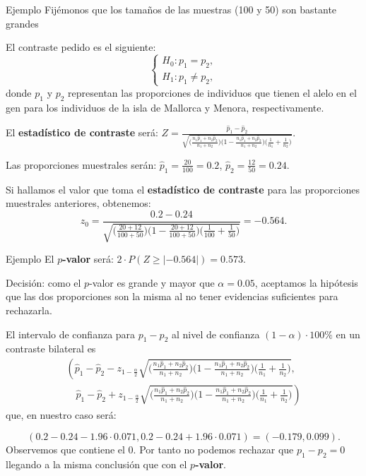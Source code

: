 \documentclass[
  ignorenonframetext,
]{beamer}
\begin{document}
\begin{frame}{Ejemplo}
\protect\hypertarget{ejemplo-42}{}
Fijémonos que los tamaños de las muestras (100 y 50) son bastante
grandes

El contraste pedido es el siguiente: \[
\left\{\begin{array}{l}
H_0:p_1=p_2,\\
H_1:p_1\neq p_2,
\end{array}\right.
\] donde \(p_1\) y \(p_2\) representan las proporciones de individuos
que tienen el alelo en el gen para los individuos de la isla de Mallorca
y Menora, respectivamente.

El \textbf{estadístico de contraste} será:
\(Z=\frac{\widehat{p}_1 -\widehat{p}_2}{ \sqrt{\Big(\frac{n_1 \widehat{p}_1 +n_2 \widehat{p}_2}{n_1 +n_2}\Big)\Big(1-\frac{n_1 \widehat{p}_1 +n_2 \widehat{p}_2}{n_1 +n_2}\Big)\Big(\frac1{n_1}+\frac1{n_2} \Big)}}.\)

Las proporciones muestrales serán:
\(\widehat{p}_1 =\frac{20}{100}=0.2\),
\(\widehat{p}_2 = \frac{12}{50}=0.24\).

Si hallamos el valor que toma el \textbf{estadístico de contraste} para
las proporciones muestrales anteriores, obtenemos:
\[z_0=\frac{0.2 -0.24}{
\sqrt{\Big(\frac{20+12}{100+50}\Big)\Big(1-\frac{20 +12}{100+50}\Big)\Big(\frac1{100}+\frac1{50}\Big)}}=-0.564.\]
\end{frame}

\begin{frame}{Ejemplo}
\protect\hypertarget{ejemplo-43}{}
El \textbf{\(p\)-valor} será: \(2\cdot P(Z\geq |-0.564|)=0.573.\)

Decisión: como el \(p\)-valor es grande y mayor que \(\alpha=0.05\),
aceptamos la hipótesis que las dos proporciones son la misma al no tener
evidencias suficientes para rechazarla.

El intervalo de confianza para \(p_1-p_2\) al nivel de confianza
\((1-\alpha)\cdot 100\%\) en un contraste bilateral es \[
\begin{array}{l}
\left(\widehat{p}_1-\widehat{p}_2-z_{1-\frac{\alpha}2}\sqrt{\Big(\frac{n_1 \widehat{p}_1 +n_2 \widehat{p}_2}{n_1
+n_2}\Big)\Big(1-\frac{n_1 \widehat{p}_1 +n_2 \widehat{p}_2}{n_1
+n_2}\Big)\Big(\frac1{n_1}+\frac1{n_2}
\Big)},\right.\\
\quad
\left.\widehat{p}_1-\widehat{p}_2+z_{1-\frac{\alpha}2}\sqrt{\Big(\frac{n_1 \widehat{p}_1 +n_2 \widehat{p}_2}{n_1
+n_2}\Big)\Big(1-\frac{n_1 \widehat{p}_1 +n_2 \widehat{p}_2}{n_1
+n_2}\Big)\Big(\frac1{n_1}+\frac1{n_2}
\Big)}
\right)
\end{array}
\] que, en nuestro caso será:

\[
(0.2 -0.24-1.96\cdot 0.071, 0.2-0.24 +1.96\cdot 0.071) =(-0.179,0.099).
\] Observemos que contiene el 0. Por tanto no podemos rechazar que
\(p_1-p_2=0\) llegando a la misma conclusión que con el
\textbf{\(p\)-valor}.
\end{frame}
\end{document}
